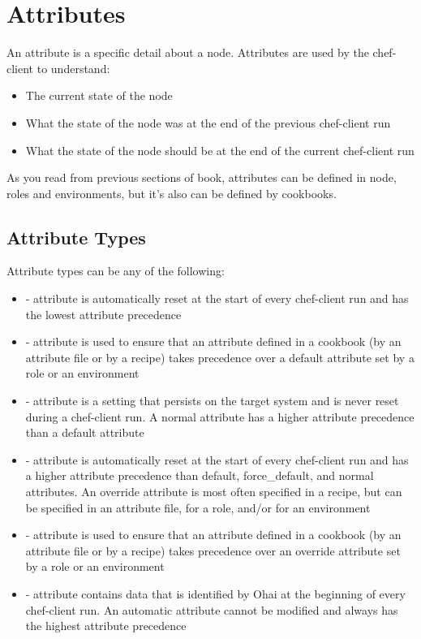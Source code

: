 \section{Attributes}\label{sec:server-attributes}

An attribute is a specific detail about a node. Attributes are used by the chef-client to understand:

\begin{itemize}
  \item The current state of the node
  \item What the state of the node was at the end of the previous chef-client run
  \item What the state of the node should be at the end of the current chef-client run
\end{itemize}

As you read from previous sections of book, attributes can be defined in node, roles and environments, but it's also can be defined by cookbooks.

\subsection{Attribute Types}

Attribute types can be any of the following:

\begin{itemize}
  \item {} - attribute is automatically reset at the start of every chef-client run and has the lowest attribute precedence
  \item {} - attribute is used to ensure that an attribute defined in a cookbook (by an attribute file or by a recipe) takes precedence over a default attribute set by a role or an environment
  \item {} - attribute is a setting that persists on the target system and is never reset during a chef-client run. A normal attribute has a higher attribute precedence than a default attribute
  \item {} - attribute is automatically reset at the start of every chef-client run and has a higher attribute precedence than default, force\_default, and normal attributes. An override attribute is most often specified in a recipe, but can be specified in an attribute file, for a role, and/or for an environment
  \item {} - attribute is used to ensure that an attribute defined in a cookbook (by an attribute file or by a recipe) takes precedence over an override attribute set by a role or an environment
  \item {} - attribute contains data that is identified by Ohai at the beginning of every chef-client run. An automatic attribute cannot be modified and always has the highest attribute precedence
\end{itemize}

